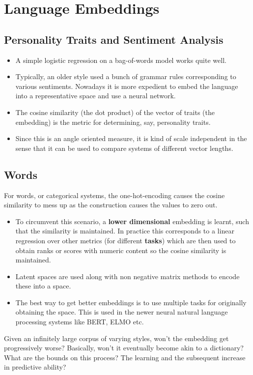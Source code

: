 \documentclass[12pt,a4paper,oneside,headinclude]{scrartcl}
\numberwithin{figure}{section}
\numberwithin{equation}{section}
\numberwithin{table}{section}
\renewenvironment{quote}{\begin{customblockquote}\list{}{\rightmargin=0em\leftmargin=0em}%
\item\relax\color{blockquote-text}\ignorespaces}{\unskip\unskip\endlist\end{customblockquote}}
\begin{document}
\section{Language Embeddings}
\label{sec:org76f8d6f}
\subsection{Personality Traits and Sentiment Analysis}
\label{sec:orgbd9fc39}
\begin{itemize}
\item A simple logistic regression on a
bag-of-words model works quite well.
\item Typically, an older style used a
bunch of grammar rules corresponding to various sentiments. Nowadays it is
more expedient to embed the language into a representative space and use a
neural network.
\item The cosine similarity (the dot product) of the
vector of traits (the embedding) is the metric for determining, say,
personality traits.
\item Since this is an angle oriented measure,
it is kind of scale independent in the sense that it can be used to compare
systems of different vector lengths.
\end{itemize}
\subsection{Words}
\label{sec:org932af0a}
For words, or categorical systems, the one-hot-encoding causes the cosine
similarity to mess up as the construction causes the values to zero out.

\begin{itemize}
\item To circumvent this scenario, a \textbf{lower dimensional} embedding is learnt, such
that the similarity is maintained. In practice this corresponds to a linear
regression over other metrics (for different \textbf{tasks}) which are then used to
obtain ranks or scores with numeric content so the cosine similarity is maintained.
\item Latent spaces are used along with non negative matrix methods to encode these
into a space.
\item The best way to get better embeddings is to use multiple tasks for originally
obtaining the space. This is used in the newer neural natural language
processing systems like BERT, ELMO etc.
\end{itemize}

\begin{quote}
Given an infinitely large corpus of varying styles, won't the embedding get
progressively worse? Basically, won't it eventually become akin to a dictionary?
What are the bounds on this process? The learning and the subsequent increase in
predictive ability?
\end{quote}
\end{document}
